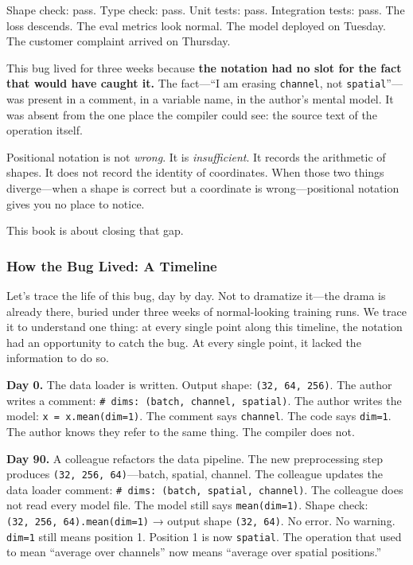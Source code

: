 \documentclass[11pt,titlepage]{article}
\begin{document}
Shape check: pass. Type check: pass. Unit tests: pass. Integration
tests: pass. The loss descends. The eval metrics look normal. The model
deployed on Tuesday. The customer complaint arrived on Thursday.

This bug lived for three weeks because \textbf{the notation had no slot
for the fact that would have caught it.} The fact---``I am erasing
\texttt{channel}, not \texttt{spatial}''---was present in a comment, in
a variable name, in the author's mental model. It was absent from the
one place the compiler could see: the source text of the operation
itself.

Positional notation is not \emph{wrong}. It is \emph{insufficient}. It
records the arithmetic of shapes. It does not record the identity of
coordinates. When those two things diverge---when a shape is correct but
a coordinate is wrong---positional notation gives you no place to
notice.

This book is about closing that gap.

\vspace{2em}

\hypertarget{how-the-bug-lived-a-timeline}{%
\subsubsection{How the Bug Lived: A
Timeline}\label{how-the-bug-lived-a-timeline}}

Let's trace the life of this bug, day by day. Not to dramatize it---the
drama is already there, buried under three weeks of normal-looking
training runs. We trace it to understand one thing: at every single
point along this timeline, the notation had an opportunity to catch the
bug. At every single point, it lacked the information to do so.

\textbf{Day 0.} The data loader is written. Output shape:
\texttt{(32,\ 64,\ 256)}. The author writes a comment:
\texttt{\#\ dims:\ (batch,\ channel,\ spatial)}. The author writes the
model: \texttt{x\ =\ x.mean(dim=1)}. The comment says \texttt{channel}.
The code says \texttt{dim=1}. The author knows they refer to the same
thing. The compiler does not.

\textbf{Day 90.} A colleague refactors the data pipeline. The new
preprocessing step produces \texttt{(32,\ 256,\ 64)}---batch, spatial,
channel. The colleague updates the data loader comment:
\texttt{\#\ dims:\ (batch,\ spatial,\ channel)}. The colleague does not
read every model file. The model still says \texttt{mean(dim=1)}. Shape
check: \texttt{(32,\ 256,\ 64).mean(dim=1)} → output shape
\texttt{(32,\ 64)}. No error. No warning. \texttt{dim=1} still means
position 1. Position 1 is now \texttt{spatial}. The operation that used
to mean ``average over channels'' now means ``average over spatial
positions.''
\end{document}

